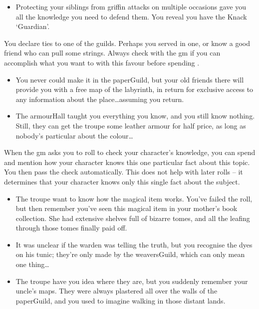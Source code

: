 \begin{multicols}{2}
\begin{itemize}
\item Protecting your siblings from griffin attacks on multiple occasions gave you all the knowledge you need to defend them.
You reveal you have the Knack `Guardian'.
\end{itemize}

You declare ties to one of the guilds.
Perhaps you served in one, or know a good friend who can pull some strings.
Always check with the \gls{gm} if you can accomplish what you want to with this favour before spending .

\begin{itemize}
  \item
  You never could make it in the \gls{paperGuild}, but your old friends there will provide you with a free map of the labyrinth, in return for exclusive access to any information about the place\ldots assuming you return.
  \item
  The \gls{armourHall} taught you everything you know, and you still know nothing.
  Still, they can get the troupe some leather armour for half price, as long as nobody's particular about the colour\ldots
\end{itemize}

\label{randomFact}
When the \gls{gm} asks you to roll to check your character's knowledge, you can spend  and mention how your character knows this one particular fact about this topic.
You then pass the check automatically.
This does not help with later rolls -- it determines that your character knows only this single fact about the subject.

\begin{itemize}
  \item
  The troupe want to know how the magical item works.
  You've failed the roll, but then remember you've seen this magical item in your mother's book collection.
  She had extensive shelves full of bizarre tomes, and all the leafing through those tomes finally paid off.
  \item
  It was unclear if the \gls{warden} was telling the truth, but you recognise the dyes on his tunic; they're only made by the \gls{weaversGuild}, which can only mean one thing\ldots
  \item
  The troupe have you idea where they are, but you suddenly remember your uncle's maps.
  They were always plastered all over the walls of the \gls{paperGuild}, and you used to imagine walking in those distant lands.
\end{itemize}


\end{multicols}
